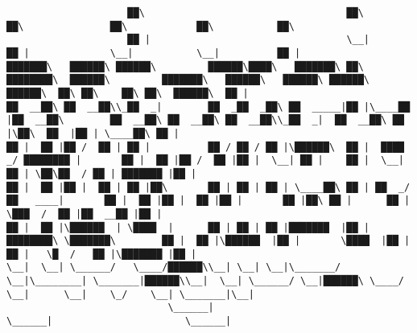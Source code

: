 \documentclass[varwidth=\maxdimen,margin=0.5cm,multi={verbatim}]{standalone}
\begin{document}
\begin{verbatim}
                     ██\                                   ██\                                                           ██\               ██\            ██\           ██\
                     ██ |                                  \__|                                                          ██ |              \__|           \__|          ██ |
███████\   ██████\ ██████\         ██████\████\   ███████\ ██\ ████████\  ██████\         ███████\   ██████\   ██████\ ██████\    ██████\  ██\ ██\    ██\ ██\  ██████\  ██ |
██  __██\ ██  __██\\_██  _|        ██  _██  _██\ ██  _____|██ |\____██  |██  __██\        ██  __██\ ██  __██\ ██  __██\\_██  _|  ██  __██\ ██ |\██\  ██  |██ | \____██\ ██ |
██ |  ██ |██ /  ██ | ██ |          ██ / ██ / ██ |\██████\  ██ |  ████ _/ ████████ |       ██ |  ██ |██ /  ██ |██ |  \__| ██ |    ██ |  \__|██ | \██\██  / ██ | ███████ |██ |
██ |  ██ |██ |  ██ | ██ |██\       ██ | ██ | ██ | \____██\ ██ | ██  _/   ██   ____|       ██ |  ██ |██ |  ██ |██ |       ██ |██\ ██ |      ██ |  \███  /  ██ |██  __██ |██ |
██ |  ██ |\██████  | \████  |      ██ | ██ | ██ |███████  |██ |████████\ \███████\        ██ |  ██ |\██████  |██ |       \████  |██ |      ██ |   \█  /   ██ |\███████ |██ |
\__|  \__| \______/   \____/██████\\__| \__| \__|\_______/ \__|\________| \_______|██████\\__|  \__| \______/ \__|██████\ \____/ \__|      \__|    \_/    \__| \_______|\__|
                            \______|                                               \______|                       \______|



\end{verbatim}
\end{document}
